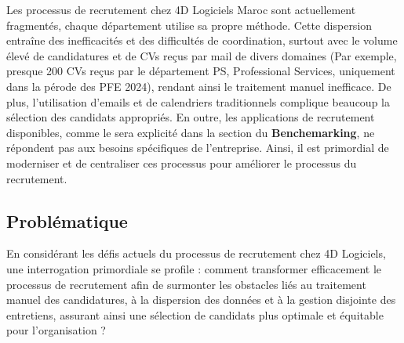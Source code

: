 Les processus de recrutement chez 4D Logiciels Maroc sont 
actuellement fragmentés, chaque département utilise sa propre 
méthode. Cette dispersion entraîne des inefficacités et des 
difficultés de coordination, surtout avec le volume élevé de 
candidatures et de CVs reçus par mail de divers domaines 
(Par exemple, presque 200 CVs reçus par le département PS, Professional Services, uniquement 
dans la pérode des PFE 2024), rendant  ainsi le traitement 
manuel inefficace. De plus, l'utilisation d'emails et de 
calendriers traditionnels complique beaucoup la sélection des candidats 
appropriés. En outre, les applications de recrutement disponibles, comme le sera explicité dans la section du \textbf{Benchemarking}, 
ne répondent pas aux besoins spécifiques de l'entreprise. Ainsi, 
il est primordial de moderniser et de centraliser ces processus 
pour améliorer le processus du recrutement.

\subsection{Problématique}

En considérant les défis actuels du processus de recrutement chez
 4D Logiciels, une interrogation primordiale se profile : 
 comment transformer efficacement le processus de recrutement 
 afin de surmonter les obstacles liés au traitement manuel des 
 candidatures, à la dispersion des données et à la gestion 
 disjointe des entretiens, assurant ainsi une sélection de 
 candidats plus optimale et équitable pour l'organisation ?

